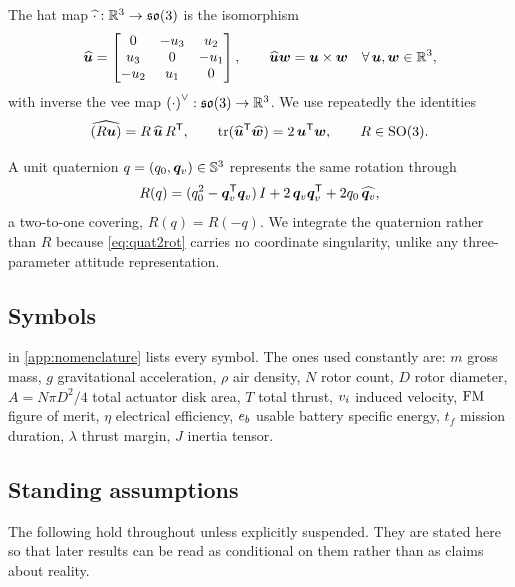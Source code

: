 The hat map $\widehat{\cdot}:\mathbb{R}^3\to\mathfrak{so}(3)$ is the isomorphism
\begin{equation}
  \widehat{\bm{u}}
  = \begin{bmatrix} 0 & -u_3 & u_2\\ u_3 & 0 & -u_1\\ -u_2 & u_1 & 0
    \end{bmatrix},
  \qquad
  \widehat{\bm{u}}\bm{w} = \bm{u}\times\bm{w}
  \quad\forall\, \bm{u},\bm{w}\in\mathbb{R}^3,
  \label{eq:hat}
\end{equation}
with inverse the vee map ${(\cdot)}^{\vee}:\mathfrak{so}(3)\to\mathbb{R}^3$. We use repeatedly
the identities
\begin{equation}
  \widehat{(R\bm{u})} = R\,\widehat{\bm{u}}\,R^{\mathsf{T}},
  \qquad
  \operatorname{tr}(\widehat{\bm{u}}^{\mathsf{T}} \widehat{\bm{w}}) = 2\,\bm{u}^{\mathsf{T}}\bm{w},
  \qquad R\in\mathrm{SO}(3) .
  \label{eq:hatid}
\end{equation}

A unit quaternion $q = (q_0,\bm{q}_v)\in\mathbb{S}^3$ represents the same
rotation through
\begin{equation}
  R(q) = (q_0^2 - \bm{q}_v^{\mathsf{T}}\bm{q}_v)\,I
       + 2\,\bm{q}_v\bm{q}_v^{\mathsf{T}}
       + 2q_0\,\widehat{\bm{q}_v},
  \label{eq:quat2rot}
\end{equation}
a two-to-one covering, $R(q)=R(-q)$. We integrate the quaternion rather than
$R$ because \cref{eq:quat2rot} carries no coordinate singularity, unlike any
three-parameter attitude representation.

\subsection{Symbols}

 in \cref{app:nomenclature} lists every symbol. The ones used
constantly are: $m$ gross mass, $g$ gravitational acceleration, $\rho$ air
density, $N$ rotor count, $D$ rotor diameter, $A = N\pi D^2/4$ total actuator
disk area, $T$ total thrust, $v_i$ induced velocity, $\mathrm{FM}$ figure of merit,
$\eta$ electrical efficiency, $e_b$ usable battery specific energy, $t_f$
mission duration, $\lambda$ thrust margin, $J$ inertia tensor.

\subsection{Standing assumptions}

The following hold throughout unless explicitly suspended. They are stated
here so that later results can be read as conditional on them rather than as
claims about reality.

